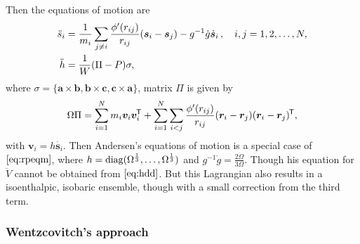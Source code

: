 Then the equations of motion are
\begin{subequations}
	\label{eq:rpeqm}
	\begin{align}
		\ddot{s}_i & = \frac{ 1 }{ m_i } \sum_{j\neq i}
		\frac{ \phi'(r_{ij}) }{ r_{ij} } (\bm{s}_i - \bm{s}_j) - g^{-1}\dot{g}
		\dot{ \bm{s} }_i \thinspace, \quad i, j = 1, 2, \ldots, N,\label{eq:rpsdd} \\
		\ddot{h}   & = \frac{ 1 }{ W } (\Pi - P) \sigma, \label{eq:hdd}
	\end{align}
\end{subequations}
where $\sigma = \{\bm{a}\times \bm{b},
	\bm{b}\times \bm{c}, \bm{c}\times \bm{a}\}$,
matrix $\Pi$ is given by
\begin{equation}\label{eq:pim&frr}
	\Omega \Pi = \sum_{i=1}^{N} m_i \bm{v}_i \bm{v}_i^{\mkern-1.5mu\mathsf{T}}
	+ \sum_{i=1}^{N} \sum_{i<j} \frac{ \phi'(r_{ij}) }{ r_{ij} }
	(\bm{r}_i - \bm{r}_j) (\bm{r}_i - \bm{r}_j)^{\mkern-1.5mu\mathsf{T}},
\end{equation}
with $\bm{v}_i = h \dot{ \bm{s}_i }$.
Then Andersen's equations of motion is a special case of
$\eqref{eq:rpeqm}$,
where $h = \operatorname{diag} (\Omega^{\frac{ 1 }{ 3 }}, \ldots,
	\Omega^{\frac{ 1 }{ 3 }})$ and $g^{-1} \dot{g} =
	\frac{ 2 \dot{\Omega} }{3 \Omega }$. Though his equation for
$\ddot{V}$ cannot be obtained from $\eqref{eq:hdd}$. But
this Lagrangian also results in a isoenthalpic, isobaric ensemble,
though with a small correction from the third term.


\subsubsection{Wentzcovitch's approach}

